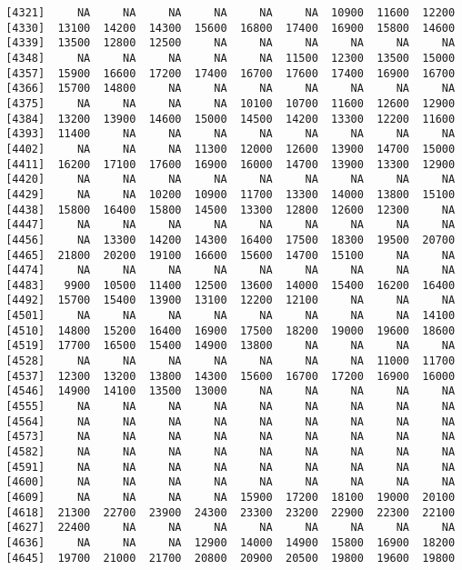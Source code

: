 \documentclass[]{article}
\begin{document}
\begin{verbatim}
 [4321]     NA     NA     NA     NA     NA     NA  10900  11600  12200
 [4330]  13100  14200  14300  15600  16800  17400  16900  15800  14600
 [4339]  13500  12800  12500     NA     NA     NA     NA     NA     NA
 [4348]     NA     NA     NA     NA     NA  11500  12300  13500  15000
 [4357]  15900  16600  17200  17400  16700  17600  17400  16900  16700
 [4366]  15700  14800     NA     NA     NA     NA     NA     NA     NA
 [4375]     NA     NA     NA     NA  10100  10700  11600  12600  12900
 [4384]  13200  13900  14600  15000  14500  14200  13300  12200  11600
 [4393]  11400     NA     NA     NA     NA     NA     NA     NA     NA
 [4402]     NA     NA     NA  11300  12000  12600  13900  14700  15000
 [4411]  16200  17100  17600  16900  16000  14700  13900  13300  12900
 [4420]     NA     NA     NA     NA     NA     NA     NA     NA     NA
 [4429]     NA     NA  10200  10900  11700  13300  14000  13800  15100
 [4438]  15800  16400  15800  14500  13300  12800  12600  12300     NA
 [4447]     NA     NA     NA     NA     NA     NA     NA     NA     NA
 [4456]     NA  13300  14200  14300  16400  17500  18300  19500  20700
 [4465]  21800  20200  19100  16600  15600  14700  15100     NA     NA
 [4474]     NA     NA     NA     NA     NA     NA     NA     NA     NA
 [4483]   9900  10500  11400  12500  13600  14000  15400  16200  16400
 [4492]  15700  15400  13900  13100  12200  12100     NA     NA     NA
 [4501]     NA     NA     NA     NA     NA     NA     NA     NA  14100
 [4510]  14800  15200  16400  16900  17500  18200  19000  19600  18600
 [4519]  17700  16500  15400  14900  13800     NA     NA     NA     NA
 [4528]     NA     NA     NA     NA     NA     NA     NA  11000  11700
 [4537]  12300  13200  13800  14300  15600  16700  17200  16900  16000
 [4546]  14900  14100  13500  13000     NA     NA     NA     NA     NA
 [4555]     NA     NA     NA     NA     NA     NA     NA     NA     NA
 [4564]     NA     NA     NA     NA     NA     NA     NA     NA     NA
 [4573]     NA     NA     NA     NA     NA     NA     NA     NA     NA
 [4582]     NA     NA     NA     NA     NA     NA     NA     NA     NA
 [4591]     NA     NA     NA     NA     NA     NA     NA     NA     NA
 [4600]     NA     NA     NA     NA     NA     NA     NA     NA     NA
 [4609]     NA     NA     NA     NA  15900  17200  18100  19000  20100
 [4618]  21300  22700  23900  24300  23300  23200  22900  22300  22100
 [4627]  22400     NA     NA     NA     NA     NA     NA     NA     NA
 [4636]     NA     NA     NA  12900  14000  14900  15800  16900  18200
 [4645]  19700  21000  21700  20800  20900  20500  19800  19600  19800

\end{verbatim}
\end{document}
